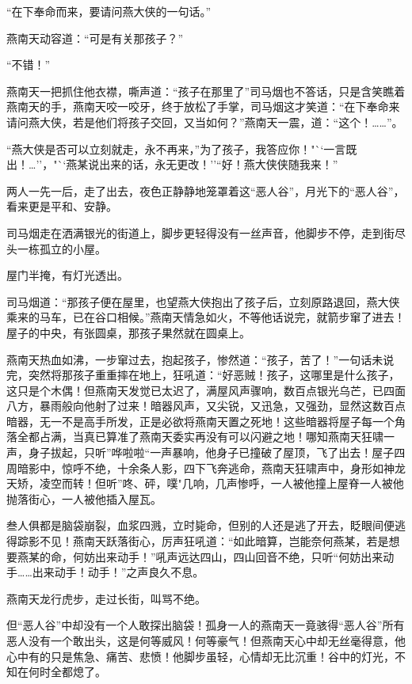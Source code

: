\documentclass[12pt,oneside]{book}
\begin{document}
``在下奉命而来，要请问燕大侠的一句话。''

燕南天动容道：``可是有关那孩子？''

``不错！''

燕南天一把抓住他衣襟，嘶声道：``孩子在那里了''司马烟也不答话，只是含笑瞧着燕南天的手，燕南天咬一咬牙，终于放松了手掌，司马烟这才笑道：``在下奉命来请问燕大侠，若是他们将孩子交回，又当如何？''燕南天一震，道：``这个！\ldots\ldots{}''。

``燕大侠是否可以立刻就走，永不再来，''为了孩子，我答应你！"``一言既出！\ldots{}''，"``燕某说出来的话，永无更改！''``好！燕大侠侠随我来！''

两人一先一后，走了出去，夜色正静静地笼罩着这``恶人谷''，月光下的``恶人谷''，看来更是平和、安静。

司马烟走在洒满银光的街道上，脚步更轻得没有一丝声音，他脚步不停，走到街尽头一栋孤立的小屋。

屋门半掩，有灯光透出。

司马烟道：``那孩子便在屋里，也望燕大侠抱出了孩子后，立刻原路退回，燕大侠乘来的马车，已在谷口相候。''燕南天情急如火，不等他话说完，就箭步窜了进去！屋子的中央，有张圆桌，那孩子果然就在圆桌上。

燕南天热血如沸，一步窜过去，抱起孩子，惨然道：``孩子，苦了！''一句话未说完，突然将那孩子重重摔在地上，狂吼道：``好恶贼！孩子，这哪里是什么孩子，这只是个木偶！但燕南天发觉已太迟了，满屋风声骤响，数百点银光乌芒，已四面八方，暴雨般向他射了过来！暗器风声，又尖锐，又迅急，又强劲，显然这数百点暗器，无一不是高手所发，正是必欲将燕南天置之死地！这些暗器将屋子每一个角落全都占满，当真已算准了燕南天委实再没有可以闪避之地！哪知燕南天狂啸一声，身子拔起，只听''哗啦啦``一声暴响，他身子已撞破了屋顶，飞了出去！屋子四周暗影中，惊呼不绝，十余条人影，四下飞奔逃命，燕南天狂啸声中，身形如神龙天矫，凌空而转！但听''咚、砰，噗"几响，几声惨呼，一人被他撞上屋脊一人被他抛落街心，一人被他插入屋瓦。

叁人俱都是脑袋崩裂，血浆四溅，立时毙命，但别的人还是逃了开去，眨眼间便逃得踪影不见！燕南天跃落街心，厉声狂吼道：``如此暗算，岂能奈何燕某，若是想要燕某的命，何妨出来动手！''吼声远达四山，四山回音不绝，只听``何妨出来动手\ldots\ldots 出来动手！动手！''之声良久不息。

燕南天龙行虎步，走过长街，叫骂不绝。

但``恶人谷''中却没有一个人敢探出脑袋！孤身一人的燕南天一竟骇得``恶人谷''所有恶人没有一个敢出头，这是何等威风！何等豪气！但燕南天心中却无丝毫得意，他心中有的只是焦急、痛苦、悲愤！他脚步虽轻，心情却无比沉重！谷中的灯光，不知在何时全都熄了。
\end{document}
